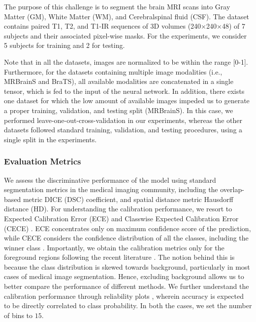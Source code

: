 \documentclass[twocolumn,final,10pt]{elsarticle}
\newcommand{\rev}[1]{{\color{black}#1}}
\begin{document}
\noindent{\textbf{\rev{MRBrainS18}} \citep{mendrik2015mrbrains}.} 
\rev{The purpose of this challenge is to segment the brain MRI scans into  Gray Matter (GM), White Matter (WM), and Cerebralspinal fluid (CSF). %
The dataset contains paired T1, T2, and T1-IR sequences of 3D volumes (240$\times$240$\times$48) of 7 subjects and their associated pixel-wise masks. For the experiments, we consider 5 subjects for training and 2 for testing.} 

\rev{Note that in all the datasets, images are normalized to be within the range [0-1]. Furthermore, for the datasets containing multiple image modalities (i.e., MRBrainS and BraTS), all available modalities are concatenated in a single tensor, which is fed to the input of the neural network. In addition, there exists one dataset for which the low amount of available images impeded us to generate a proper training, validation, and testing split (MRBrainS). In this case, we performed leave-one-out-cross-validation in our experiments, whereas the other datasets followed standard training, validation, and testing procedures, using a single split in the experiments.}



\subsubsection{Evaluation Metrics}
\rev{We assess the discriminative performance of the model using standard segmentation metrics in the medical imaging community, including the overlap-based metric DICE (DSC) coefficient, and spatial distance metric Hausdorff distance (HD). For understanding the calibration performance, we resort to Expected Calibration Error (ECE) and Classwise Expected Calibration Error (CECE) \citep{naeini2015obtaining}. ECE concentrates only on maximum confidence score of the prediction, while CECE considers the confidence distribution of all the classes, including the winner class \citep{mukhoti2020calibrating}. Importantly, we obtain the calibration metrics only for the foreground regions following the recent literature   \citep{islam2021spatially,murugesan2022calibrating}. The notion behind this is because the class distribution is skewed towards background, particularly in most cases of medical image segmentation. Hence, excluding background allows us to better compare the performance of different methods. We further understand the calibration performance through reliability plots \citep{niculescu2005predicting}, wherein accuracy is expected to be directly correlated to class probability. In both the cases, we set the number of bins to $15$.}
\end{document}
